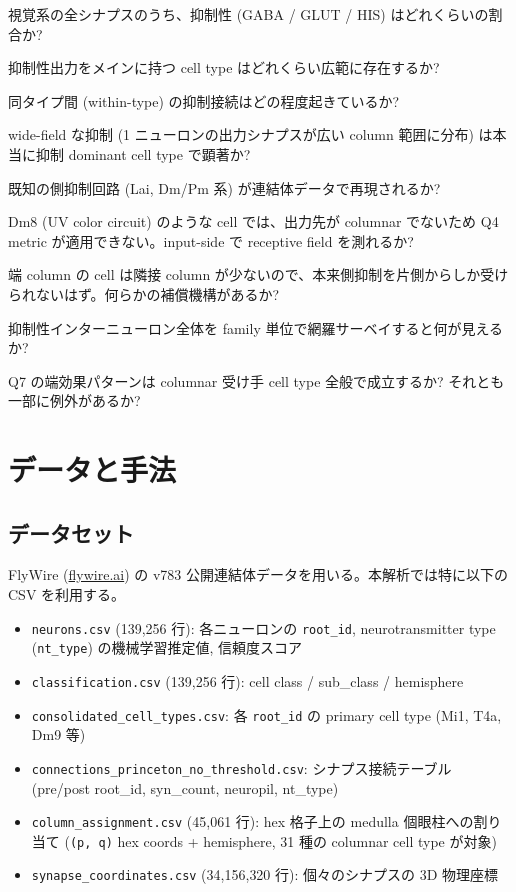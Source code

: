 \documentclass[11pt,a4paper]{ltjsarticle}
\begin{document}
\begin{description}[leftmargin=2em, style=nextline]
\item[Q1] 視覚系の全シナプスのうち、抑制性 (GABA / GLUT / HIS) はどれくらいの割合か?
\item[Q2] 抑制性出力をメインに持つ cell type はどれくらい広範に存在するか?
\item[Q3] 同タイプ間 (within-type) の抑制接続はどの程度起きているか?
\item[Q4] wide-field な抑制 (1 ニューロンの出力シナプスが広い column 範囲に分布) は本当に抑制 dominant cell type で顕著か?
\item[Q5] 既知の側抑制回路 (Lai, Dm/Pm 系) が連結体データで再現されるか?
\item[Q6] Dm8 (UV color circuit) のような cell では、出力先が columnar でないため Q4 metric が適用できない。input-side で receptive field を測れるか?
\item[Q7] 端 column の cell は隣接 column が少ないので、本来側抑制を片側からしか受けられないはず。何らかの補償機構があるか?
\item[Q8] 抑制性インターニューロン全体を family 単位で網羅サーベイすると何が見えるか?
\item[Q9] Q7 の端効果パターンは columnar 受け手 cell type 全般で成立するか? それとも一部に例外があるか?
\end{description}

\section{データと手法}\label{sec:methods}

\subsection{データセット}

FlyWire (\href{https://flywire.ai}{flywire.ai}) の v783 公開連結体データを用いる。本解析では特に以下の CSV を利用する。
\begin{itemize}
\item \texttt{neurons.csv} (139{,}256 行): 各ニューロンの \texttt{root\_id}, neurotransmitter type (\texttt{nt\_type}) の機械学習推定値, 信頼度スコア
\item \texttt{classification.csv} (139{,}256 行): cell class / sub\_class / hemisphere
\item \texttt{consolidated\_cell\_types.csv}: 各 \texttt{root\_id} の primary cell type (Mi1, T4a, Dm9 等)
\item \texttt{connections\_princeton\_no\_threshold.csv}: シナプス接続テーブル (pre/post root\_id, syn\_count, neuropil, nt\_type)
\item \texttt{column\_assignment.csv} (45{,}061 行): hex 格子上の medulla 個眼柱への割り当て (\texttt{(p, q)} hex coords + hemisphere, 31 種の columnar cell type が対象)
\item \texttt{synapse\_coordinates.csv} (34{,}156{,}320 行): 個々のシナプスの 3D 物理座標
\end{itemize}
\end{document}
